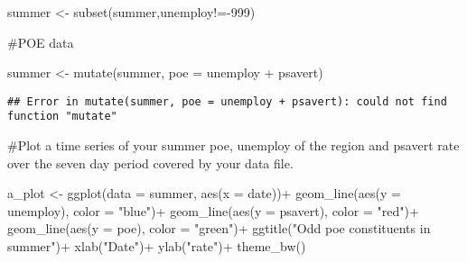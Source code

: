\documentclass[
]{article}
\newenvironment{Shaded}{\begin{snugshade}}{\end{snugshade}}
\newcommand{\AttributeTok}[1]{\textcolor[rgb]{0.77,0.63,0.00}{#1}}
\newcommand{\DecValTok}[1]{\textcolor[rgb]{0.00,0.00,0.81}{#1}}
\newcommand{\FunctionTok}[1]{\textcolor[rgb]{0.00,0.00,0.00}{#1}}
\newcommand{\NormalTok}[1]{#1}
\newcommand{\OtherTok}[1]{\textcolor[rgb]{0.56,0.35,0.01}{#1}}
\newcommand{\SpecialCharTok}[1]{\textcolor[rgb]{0.00,0.00,0.00}{#1}}
\newcommand{\StringTok}[1]{\textcolor[rgb]{0.31,0.60,0.02}{#1}}
\begin{document}
\begin{Shaded}
\begin{Highlighting}[]
\NormalTok{summer }\OtherTok{\textless{}{-}} \FunctionTok{subset}\NormalTok{(summer,unemploy}\SpecialCharTok{!={-}}\DecValTok{999}\NormalTok{)}
\end{Highlighting}
\end{Shaded}

\#POE data

\begin{Shaded}
\begin{Highlighting}[]
\NormalTok{summer }\OtherTok{\textless{}{-}} \FunctionTok{mutate}\NormalTok{(summer, }\AttributeTok{poe =}\NormalTok{ unemploy }\SpecialCharTok{+}\NormalTok{ psavert)}
\end{Highlighting}
\end{Shaded}

\begin{verbatim}
## Error in mutate(summer, poe = unemploy + psavert): could not find function "mutate"
\end{verbatim}

\#Plot a time series of your summer poe, unemploy of the region and
psavert rate over the seven day period covered by your data file.

\begin{Shaded}
\begin{Highlighting}[]
\NormalTok{a\_plot }\OtherTok{\textless{}{-}} \FunctionTok{ggplot}\NormalTok{(}\AttributeTok{data =}\NormalTok{ summer, }\FunctionTok{aes}\NormalTok{(}\AttributeTok{x =}\NormalTok{ date))}\SpecialCharTok{+}
  \FunctionTok{geom\_line}\NormalTok{(}\FunctionTok{aes}\NormalTok{(}\AttributeTok{y =}\NormalTok{ unemploy), }\AttributeTok{color =} \StringTok{"blue"}\NormalTok{)}\SpecialCharTok{+}
  \FunctionTok{geom\_line}\NormalTok{(}\FunctionTok{aes}\NormalTok{(}\AttributeTok{y =}\NormalTok{ psavert), }\AttributeTok{color =} \StringTok{"red"}\NormalTok{)}\SpecialCharTok{+}
  \FunctionTok{geom\_line}\NormalTok{(}\FunctionTok{aes}\NormalTok{(}\AttributeTok{y =}\NormalTok{ poe), }\AttributeTok{color =} \StringTok{"green"}\NormalTok{)}\SpecialCharTok{+}
  \FunctionTok{ggtitle}\NormalTok{(}\StringTok{"Odd poe constituents in summer"}\NormalTok{)}\SpecialCharTok{+}
  \FunctionTok{xlab}\NormalTok{(}\StringTok{"Date"}\NormalTok{)}\SpecialCharTok{+}
  \FunctionTok{ylab}\NormalTok{(}\StringTok{"rate"}\NormalTok{)}\SpecialCharTok{+}
  \FunctionTok{theme\_bw}\NormalTok{()}
\end{Highlighting}
\end{Shaded}
\end{document}
